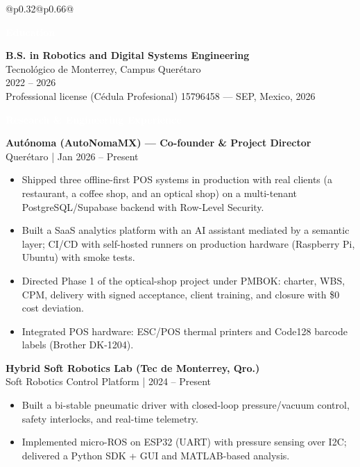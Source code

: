 \documentclass[10pt,letterpaper]{article}
\newcommand{\smalltext}[1]{\small #1}
\newcommand{\sectionbar}[1]{\colorbox{accent}{\parbox{\dimexpr\linewidth-2\fboxsep}{\textcolor{white}{\bfseries #1}}}}
\begin{document}
\begin{tabularx}{\textwidth}{@{}p{0.32\textwidth}@{\hspace{0.02\textwidth}}p{0.66\textwidth}@{}}
\begin{minipage}[t]{\linewidth}
\sectionbar{Education}
\textbf{B.S. in Robotics and Digital Systems Engineering}\\
Tecnológico de Monterrey, Campus Querétaro\\
\smalltext{2022 -- 2026}\\
\smalltext{Professional license (Cédula Profesional) 15796458 — SEP, Mexico, 2026}\\[0.4em]

\sectionbar{Research \& Engineering Experience}
\textbf{Autónoma (AutoNomaMX) — Co-founder \& Project Director}\\
\smalltext{Querétaro | Jan 2026 -- Present}
\begin{itemize}[leftmargin=*]
  \item Shipped three offline-first POS systems in production with real clients (a restaurant, a coffee shop, and an optical shop) on a multi-tenant PostgreSQL/Supabase backend with Row-Level Security.
  \item Built a SaaS analytics platform with an AI assistant mediated by a semantic layer; CI/CD with self-hosted runners on production hardware (Raspberry Pi, Ubuntu) with smoke tests.
  \item Directed Phase 1 of the optical-shop project under PMBOK: charter, WBS, CPM, delivery with signed acceptance, client training, and closure with \$0 cost deviation.
  \item Integrated POS hardware: ESC/POS thermal printers and Code128 barcode labels (Brother DK-1204).
\end{itemize}

\textbf{Hybrid Soft Robotics Lab (Tec de Monterrey, Qro.)}\\
\smalltext{Soft Robotics Control Platform | 2024 -- Present}
\begin{itemize}[leftmargin=*]
  \item Built a bi-stable pneumatic driver with closed-loop pressure/vacuum control, safety interlocks, and real-time telemetry.
  \item Implemented micro-ROS on ESP32 (UART) with pressure sensing over I2C; delivered a Python SDK + GUI and MATLAB-based analysis.
\end{itemize}


\end{minipage}
\end{tabularx}
\end{document}

